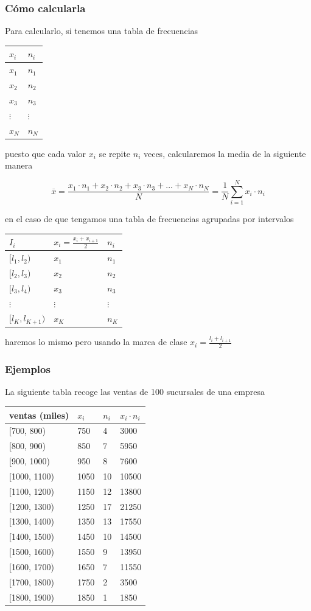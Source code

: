 \documentclass[
]{article}
\begin{document}
\hypertarget{cuxf3mo-calcularla}{%
\subsubsection{Cómo calcularla}\label{cuxf3mo-calcularla}}

Para calcularlo, si tenemos una tabla de frecuencias

\begin{longtable}[]{@{}ll@{}}
\toprule
\(x_i\) & \(n_i\)\tabularnewline
\midrule
\endhead
\(x_1\) & \(n_1\)\tabularnewline
\(x_2\) & \(n_2\)\tabularnewline
\(x_3\) & \(n_3\)\tabularnewline
\(\vdots\) & \(\vdots\)\tabularnewline
\(x_N\) & \(n_N\)\tabularnewline
\bottomrule
\end{longtable}

puesto que cada valor \(x_i\) se repite \(n_i\) veces, calcularemos la
media de la siguiente manera

\[\overline x = \frac{x_1 \cdot n_1 + x_2  \cdot n_2 + x_3  \cdot n_3 +\ldots  + x_N  \cdot n_N}{N} = \frac{1}{N}\sum^{N}_{i=1} x_i  \cdot n_i\]

en el caso de que tengamos una tabla de frecuencias agrupadas por
intervalos

\begin{longtable}[]{@{}lll@{}}
\toprule
\(I_i\) & \(x_i = \frac{x_i + x_{i+1}}{2}\) & \(n_i\)\tabularnewline
\midrule
\endhead
\([l_1, l_2)\) & \(x_1\) & \(n_1\)\tabularnewline
\([l_2, l_3)\) & \(x_2\) & \(n_2\)\tabularnewline
\([l_3, l_4)\) & \(x_3\) & \(n_3\)\tabularnewline
\(\vdots\) & \(\vdots\) & \(\vdots\)\tabularnewline
\([l_{K}, l_{K+1})\) & \(x_K\) & \(n_K\)\tabularnewline
\bottomrule
\end{longtable}

haremos lo mismo pero usando la marca de clase
\(x_i = \frac{l_i + l_{i+1}}{2}\)

\hypertarget{ejemplos}{%
\subsubsection{Ejemplos}\label{ejemplos}}

La siguiente tabla recoge las ventas de 100 sucursales de una empresa

\begin{longtable}[]{@{}llll@{}}
\toprule
ventas (miles) & \(x_i\) & \(n_i\) & \(x_i \cdot n_i\)\tabularnewline
\midrule
\endhead
{[}700, 800) & 750 & 4 & 3000\tabularnewline
{[}800, 900) & 850 & 7 & 5950\tabularnewline
{[}900, 1000) & 950 & 8 & 7600\tabularnewline
{[}1000, 1100) & 1050 & 10 & 10500\tabularnewline
{[}1100, 1200) & 1150 & 12 & 13800\tabularnewline
{[}1200, 1300) & 1250 & 17 & 21250\tabularnewline
{[}1300, 1400) & 1350 & 13 & 17550\tabularnewline
{[}1400, 1500) & 1450 & 10 & 14500\tabularnewline
{[}1500, 1600) & 1550 & 9 & 13950\tabularnewline
{[}1600, 1700) & 1650 & 7 & 11550\tabularnewline
{[}1700, 1800) & 1750 & 2 & 3500\tabularnewline
{[}1800, 1900) & 1850 & 1 & 1850\tabularnewline
\bottomrule
\end{longtable}
\end{document}
